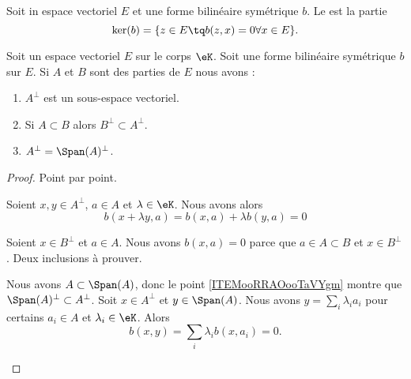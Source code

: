 \begin{definition}		\label{DEFooQQBQooKJdwxO}
	Soit in espace vectoriel \( E\) et une forme bilinéaire symétrique \( b\). Le  est la partie
	\begin{equation}
		\ker(b)=\{ z\in E\tq b(z,x)=0\forall x\in E \}.
	\end{equation}
\end{definition}

\begin{proposition}		\label{PROPooWPKRooUAnVzd}
	Soit un espace vectoriel \( E\) sur le corps \( \eK\). Soit une forme bilinéaire symétrique \( b\) sur \( E\). Si \( A\) et \( B\) sont des parties de \( E\) nous avons :
	\begin{enumerate}
		\item		\label{ITEMooCGEIooKpSNXS}
		      \( A^{\perp}\) est un sous-espace vectoriel.
		\item	\label{ITEMooRRAOooTaVYgm}
		      Si \( A\subset B\) alors \( B^{\perp}\subset A^{\perp}\).
		\item	\label{ITEMooBKXFooEpObWC}
		      \( A^{\perp}=\Span(A)^{\perp}\).
	\end{enumerate}
\end{proposition}

\begin{proof}
	Point par point.
	\begin{subproof}

		Soient \( x,y\in A^{\perp}\), \( a\in A\) et \( \lambda\in \eK\). Nous avons alors
		\begin{equation}
			b(x+\lambda y,a)=b(x,a)+\lambda b(y,a)=0
		\end{equation}


		Soient \( x\in B^{\perp}\) et \( a\in A\). Nous avons \( b(x,a)=0\) parce que \( a\in A\subset B\) et \( x\in B^{\perp}\).
		Deux inclusions à prouver.

		\begin{subproof}
			Nous avons \( A\subset \Span(A)\), donc le point \ref{ITEMooRRAOooTaVYgm} montre que \( \Span(A)^{\perp}\subset A^{\perp}\).
			Soit \( x\in A^{\perp}\) et \( y\in\Span(A)\). Nous avons \( y=\sum_i\lambda_ia_i\) pour certains \( a_i\in A\) et \( \lambda_i\in \eK\). Alors
			\begin{equation}
				b(x,y)=\sum_i\lambda_ib(x,a_i)=0.
			\end{equation}
		\end{subproof}
	\end{subproof}
\end{proof}



